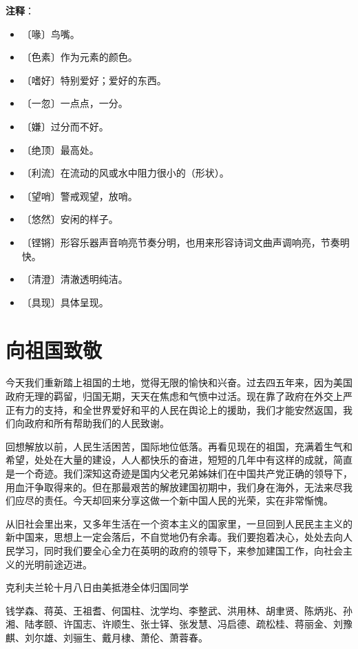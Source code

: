\documentclass[12pt,UTF-8,openany]{ctexbook}
\begin{document}
\newpage

\textbf{注释}：

\vspace{-1em}

\begin{itemize}
    \setlength\itemsep{-0.2em}
    \item 〔喙〕鸟嘴。
    \item 〔色素〕作为元素的颜色。
    \item 〔嗜好〕特别爱好；爱好的东西。
    \item 〔一忽〕一点点，一分。
    \item 〔嫌〕过分而不好。
    \item 〔绝顶〕最高处。
    \item 〔利流〕在流动的风或水中阻力很小的（形状）。
    \item 〔望哨〕警戒观望，放哨。
    \item 〔悠然〕安闲的样子。
    \item 〔铿锵〕形容乐器声音响亮节奏分明，也用来形容诗词文曲声调响亮，节奏明快。
    \item 〔清澄〕清澈透明纯洁。
    \item 〔具现〕具体呈现。
\end{itemize}

\chapter{向祖国致敬}

\begin{large}
    
    今天我们重新踏上祖国的土地，觉得无限的愉快和兴奋。过去四五年来，因为美国政府无理的羁留，归国无期，天天在焦虑和气愤中过活。现在靠了政府在外交上严正有力的支持，和全世界爱好和平的人民在舆论上的援助，我们才能安然返国，我们向政府和所有帮助我们的人民致谢。
    
    回想解放以前，人民生活困苦，国际地位低落。再看见现在的祖国，充满着生气和希望，处处在大量的建设，人人都快乐的奋进，短短的几年中有这样的成就，简直是一个奇迹。我们深知这奇迹是国内父老兄弟姊妹们在中国共产党正确的领导下，用血汗争取得来的。但在那最艰苦的解放建国初期中，我们身在海外，无法来尽我们应尽的责任。今天却回来分享这做一个新中国人民的光荣，实在非常惭愧。
    
    从旧社会里出来，又多年生活在一个资本主义的国家里，一旦回到人民民主主义的新中国来，思想上一定会落后，不自觉地仍有余毒。我们要抱着决心，处处去向人民学习，同时我们要全心全力在英明的政府的领导下，来参加建国工作，向社会主义的光明前途迈进。
    
    \hfill 克利夫兰轮十月八日由美抵港全体归国同学
    
    \hfill 钱学森、蒋英、王祖耆、何国柱、沈学均、李整武、洪用林、胡聿贤、陈炳兆、孙湘、陆孝颐、许国志、许顺生、张士铎、张发慧、冯启德、疏松桂、蒋丽金、刘豫麒、刘尔雄、刘骊生、戴月棣、萧伦、萧蓉春。
    
\end{large}
\end{document}
